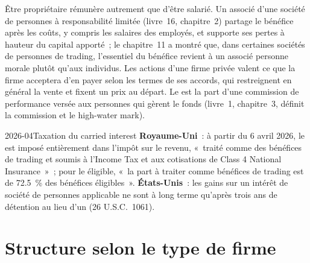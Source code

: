 Être propriétaire rémunère autrement que d'être salarié. Un associé d'une société de personnes à responsabilité limitée (livre~16, chapitre~2)
partage le bénéfice après les coûts, y compris les salaires des employés, et supporte ses pertes à hauteur du capital apporté~; le chapitre~11
a montré que, dans certaines sociétés de personnes de trading, l'essentiel du bénéfice revient à un associé personne morale plutôt qu'aux individus.
Les actions d'une firme privée valent ce que la firme acceptera d'en payer selon les termes de ses accords, qui restreignent en général la
vente et fixent un prix au départ. Le  est la part d'une commission de performance versée aux personnes qui gèrent
le fonds (livre~1, chapitre~3, définit la commission et le high-water mark).

\begin{dated}{2026-04}{Taxation du carried interest}\label{dat:in:how-pay-works:carry}
\textbf{Royaume-Uni}~: à partir du 6 avril 2026, le  est imposé entièrement dans l'impôt sur le revenu, «~traité comme des bénéfices
de trading et soumis à l'Income Tax et aux cotisations de Class 4 National Insurance~»~; pour le  éligible, «~la part à traiter
comme bénéfices de trading est de 72.5~\% des bénéfices éligibles~». \textbf{États-Unis}~: les gains sur un intérêt de société de personnes
applicable ne sont à long terme qu'après trois ans de détention au lieu d'un (26 U.S.C.\ 1061).
\end{dated}

\section{Structure selon le type de firme}

